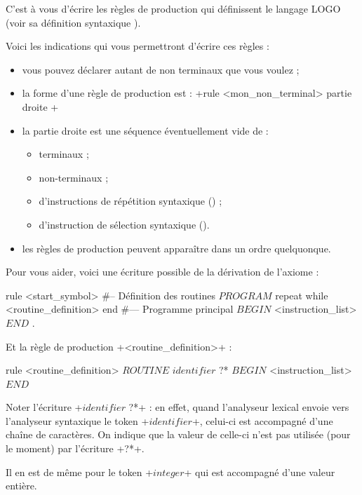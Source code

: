 C'est à vous d'écrire les règles de production qui définissent le langage LOGO (voir sa définition syntaxique ).

Voici les indications qui vous permettront d'écrire ces règles :
\begin{itemize}
  \item vous pouvez déclarer autant de non terminaux que vous voulez ;
  \item la forme d'une règle de production est : \ggs+rule <mon_non_terminal> { partie droite }+
  \item la partie droite est une séquence éventuellement vide de :
  \begin{itemize}
    \item terminaux ;
    \item non-terminaux ;
    \item d'instructions de répétition syntaxique () ;
    \item d'instruction de sélection syntaxique ().
  \end{itemize}
  \item les règles de production peuvent apparaître dans un ordre quelquonque.
\end{itemize}

Pour vous aider, voici une écriture possible de la dérivation de l'axiome :

\begin{galgas}
rule <start_symbol> {
#-- Définition des routines
  $PROGRAM$
  repeat
  while
    <routine_definition>
  end
#--- Programme principal
  $BEGIN$
  <instruction_list> 
  $END$
  $.$
}
\end{galgas}

Et la règle de production \ggs+<routine_definition>+ :

\begin{galgas}
rule <routine_definition> {
  $ROUTINE$
  $identifier$ ?*
  $BEGIN$
  <instruction_list>
  $END$
}
\end{galgas}

Noter l’écriture \ggs+$identifier$ ?*+ : en effet, quand l’analyseur lexical envoie vers l’analyseur syntaxique le token \ggs+$identifier$+, celui-ci est accompagné d’une chaîne de caractères. On indique que la valeur de celle-ci n’est pas utilisée (pour le moment) par l’écriture \ggs+?*+.

Il en est de même pour le token \ggs+$integer$+ qui est accompagné d’une valeur entière.

